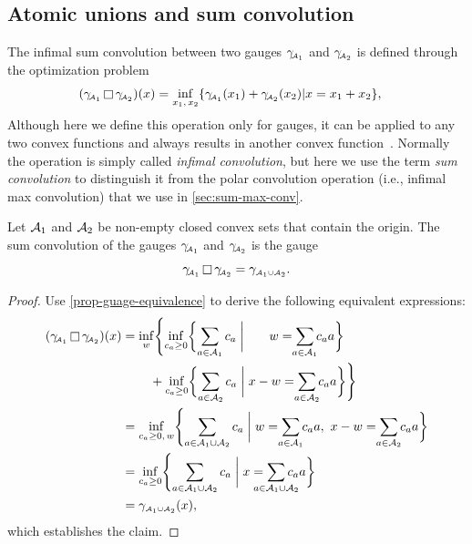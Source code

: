 \subsection{Atomic unions and sum convolution} \label{sec:atomic-unions}

The infimal sum convolution between two gauges $\gamma_{\!\scriptscriptstyle\mathcal{A}_1}$ and
$\gamma_{\!\scriptscriptstyle\mathcal{A}_2}$ is defined through the optimization problem
\begin{align*}
  (\gamma_{\!\scriptscriptstyle\mathcal{A}_1}\mathop\square\gamma_{\!\scriptscriptstyle\mathcal{A}_2})(x)
  &= \inf_{x_1,\,x_2}
  \{\gamma_{\!\scriptscriptstyle\mathcal{A}_1}(x_1)+\gamma_{\!\scriptscriptstyle\mathcal{A}_2}(x_2) | x = x_1 + x_2\},
\end{align*}
Although here we define this operation only for gauges, it can be applied to any
two convex functions and always results in another convex
function~\cite[Theorem~5.4]{rockafellar1970convex}. Normally the operation is
simply called \emph{infimal convolution}, but here we use the term \emph{sum
convolution} to distinguish it from the polar convolution operation (i.e.,
infimal max convolution) that we use in \autoref{sec:sum-max-conv}.

\begin{proposition} \label{prop:sum-convolution}
  Let $\mathcal{A}_1$ and $\mathcal{A}_2$ be non-empty closed convex sets that
  contain the origin. The sum convolution of the gauges
  $\gamma_{\!\scriptscriptstyle\mathcal{A}_1}$ and $\gamma_{\!\scriptscriptstyle\mathcal{A}_2}$ is the gauge
  \[
    \gamma_{\!\scriptscriptstyle\mathcal{A}_1}\mathop\square\gamma_{\!\scriptscriptstyle\mathcal{A}_2} =
    \gamma_{\scriptscriptstyle\mathcal{A}_1\cup\mathcal{A}_2}.
  \]
\end{proposition}

\begin{proof}
  Use \autoref{prop-guage-equivalence} to derive the following equivalent expressions:
  \begin{align*}
    (\gauge\Aso\infc\gauge\Ast)(x)
    &= \inf_w\Biggl\{
      \inf_{c_{a}\ge0}
      \biggl\{
        \sum_{a\in\Ascr_1}c_a \biggm
        |\ \phantom{x-}w=\sum_{\mathclap{a\in\Ascr_1}}c_aa
      \biggr\}
      \\&\phantom{\inf\Biggl\{\,}+
      \inf_{c_{a}\ge0}
      \biggl\{
        \sum_{a\in\Ascr_2}c_a \biggm|
        x-w=\sum_{\mathclap{a\in\Ascr_2}}c_aa
      \biggr\}      
    \Biggr\}
    \\
    &= \inf_{c_a\ge0,\, w}\Biggl\{
      \sum_{a\in\Ascr_1\cup\Ascr_2}c_a \biggm|
      w = \sum_{\mathclap{a\in\Ascr_1}}c_aa,\
      x-w = \sum_{\mathclap{a\in\Ascr_2}}c_aa
      \biggr\}
  \\&= \inf_{c_a\ge0}\Biggl\{
      \sum_{a\in\Ascr_1\cup\Ascr_2}c_a \biggm|
      x = \sum_{\mathclap{a\in\Ascr_1\cup\Ascr_2}}c_aa
    \biggr\}
  \\&= \gauge_{\scriptscriptstyle\Ascr_1\cup\Ascr_2}(x),
  \end{align*}
  which establishes the claim.
\end{proof}














